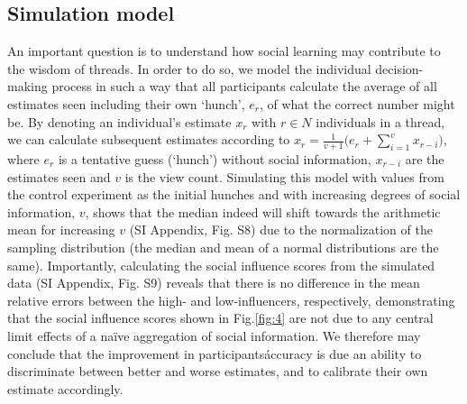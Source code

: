 \documentclass[9pt,twocolumn,twoside,lineno]{article}
\begin{document}
{\subsection*{Simulation model} An important question is to understand how social learning may contribute to the wisdom of threads. In order to do so, we model the individual decision-making process in such a way that all participants calculate the average of all estimates seen including their own ‘hunch’, $e_r$, of what the correct number might be. By denoting an individual’s estimate $x_r$ with $r \in N$ individuals in a thread, we can calculate subsequent estimates according to $x_r = \frac{1}{v+1} \big(e_r + \sum_{i=1}^{v} x_{r-i}\big)$, where $e_r$ is a tentative guess (‘hunch’) without social information, $x_{r-i}$ are the estimates seen and $v$ is the view count. Simulating this model with values from the control experiment as the initial hunches and with increasing degrees of social information, $v$, shows that the median indeed will shift towards the arithmetic mean for increasing $v$ (SI Appendix, Fig. S8) due to the normalization of the sampling distribution (the median and mean of a normal distributions are the same). Importantly, calculating the social influence scores from the simulated data (SI Appendix, Fig. S9) reveals that there is no difference in the mean relative errors between the high- and low-influencers, respectively, demonstrating that the social influence scores shown in Fig.\ref{fig:4} are not due to any central limit effects of a naïve aggregation of social information. We therefore may conclude that the improvement in participants\' accuracy is due an ability to discriminate between better and worse estimates, and to calibrate their own estimate accordingly.}
\showmatmethods{} %

\showacknow{} %


\end{document}
